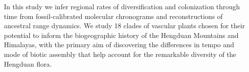 

In this study we infer regional rates of diversification and colonization through time from fossil-calibrated molecular chronograms and reconstructions of ancestral range dynamics. We study 18 clades of vascular plants chosen for their potential to inform the biogeographic history of the Hengduan Mountains and Himalayas, with the primary aim of discovering the differences in tempo and mode of biotic assembly that help account for the remarkable diversity of the Hengduan flora.


